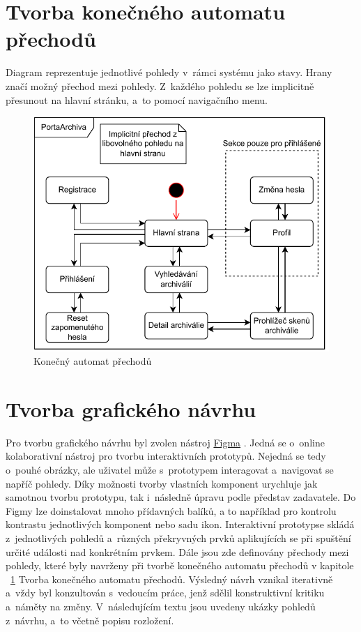 
\newpage
\section{Tvorba konečného automatu přechodů}
\label{sec:transitionStateMachine}
Diagram reprezentuje jednotlivé pohledy v~rámci systému jako stavy. Hrany značí možný přechod mezi pohledy. Z~každého pohledu se lze implicitně přesunout na hlavní stránku, a~to pomocí navigačního menu.
\begin{figure}[htbp]
\centering
    \includegraphics[scale=1.2]{obrazky-figures/design/PageTransitionStateMachine.pdf}
    \caption{Konečný automat přechodů}
\end{figure}

\newpage
\section{Tvorba grafického návrhu}
Pro tvorbu grafického návrhu byl zvolen nástroj \href{https://www.figma.com}{Figma} \cite{figma}. Jedná se o~online kolaborativní nástroj pro tvorbu interaktivních prototypů. Nejedná se tedy o~pouhé obrázky, ale uživatel může s~prototypem interagovat a~navigovat se napříč pohledy. Díky možnosti tvorby vlastních komponent urychluje jak samotnou tvorbu prototypu, tak i~následně úpravu podle představ zadavatele. Do Figmy lze doinstalovat mnoho přídavných balíků, a to například pro kontrolu kontrastu jednotlivých komponent nebo sadu ikon.
\newpara
Interaktivní prototyp\footnotemark se skládá z~jednotlivých pohledů a~různých překryvných prvků aplikujících se při spuštění určité události nad konkrétním prvkem. Dále jsou zde definovány přechody mezi pohledy, které byly navrženy při tvorbě konečného automatu přechodů v kapitole ~\ref{sec:transitionStateMachine} Tvorba konečného automatu přechodů. Výsledný návrh vznikal iterativně a~vždy byl konzultován s~vedoucím práce, jenž sdělil konstruktivní kritiku a~náměty na změny. V~následujícím textu jsou uvedeny ukázky pohledů z~návrhu, a~to včetně popisu rozložení.

